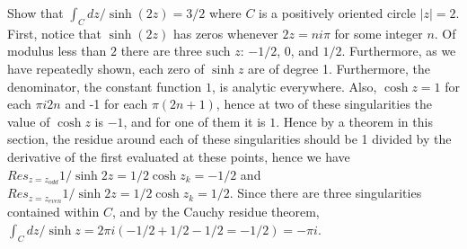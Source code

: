 \documentclass{article}
\theoremstyle{definition}
\newcommand{\cs}[1]{\color{blue}{#1}\normalcolor}
\begin{document}
\cs{5/5}

 Show that $\int_C dz/\sinh(2z) = 3/2$ \cs{$3/2$?} where $C$ is a positively oriented circle $|z| = 2$.\\

 First, notice that $\sinh(2z)$ has zeros whenever $2z = ni\pi$ for some integer $n$. Of modulus less than $2$ there are three such $z$: $-1/2$, $0$, and $1/2$. Furthermore, as we have repeatedly shown, each zero of $\sinh z$ are of degree 1. Furthermore, the denominator, the constant function $1$, is analytic everywhere. Also, $\cosh z = 1$ for each $\pi i2n$ and -1 for  each $\pi (2n+1) $, hence at two of these singularities the value of $\cosh z$ is $-1$, and for one of them it is $1$. Hence by a theorem in this section, the residue around each of these singularities should be 1 divided by the derivative of the first evaluated at these points, hence we have $Res_{z = z_{odd}}1/\sinh 2z = 1/2\cosh z_k = -1/2$ and $Res_{z = z_{even}}1/\sinh 2z = 1/2\cosh z_k = 1/2$. Since there are three singularities contained within $C$, and by the Cauchy residue theorem, $\int_Cdz/\sinh z = 2\pi i(-1/2 + 1/2 -1/2 = -1/2) = -\pi i$.

\cs{5/5}

\cs{Sec 83: 15/15}
\end{document}
